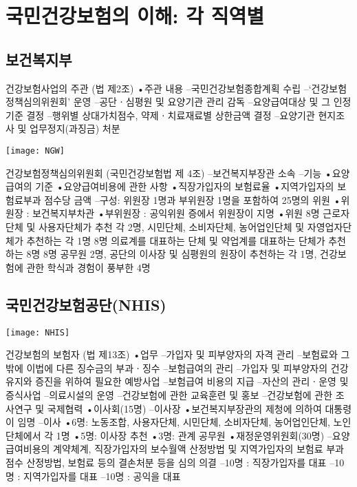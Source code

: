 \section{국민건강보험의 이해: 각 직역별}
\subsection{보건복지부}
건강보험사업의 주관 (법 제2조)
•주관 내용
–국민건강보험종합계획 수립
–‘건강보험정책심의위원회’ 운영
–공단ㆍ심평원 및 요양기관 관리 감독
–요양급여대상 및 그 인정기준 결정
–행위별 상대가치점수, 약제ㆍ치료재료별 상한금액 결정
–요양기관 현지조사 및 업무정지(과징금) 처분
\begin{center}
\texttt{[image: NGW]}
\end{center}
건강보험정책심의위원회 (국민건강보험법 제 4조)
–보건복지부장관 소속
–기능
•요양급여의 기준
•요양급여비용에 관한 사항
•직장가입자의 보험료율
•지역가입자의 보험료부과 점수당 금액
–구성: 위원장 1명과 부위원장 1명을 포함하여 25명의 위원
•위원장 : 보건복지부차관
•부위원장 : 공익위원 증에서 위원장이 지명
•위원
8명 근로자단체 및 사용자단체가 추천 각 2명,
시민단체, 소비자단체, 농어업인단체 및 자영업자단체가 추천하는 각 1명
8명 의료계를 대표하는 단체 및 약업계를 대표하는 단체가 추천하는 8명
8명 공무원 2명, 공단의 이사장 및 심평원의 원장이 추천하는 각 1명,
건강보험에 관한 학식과 경험이 풍부한 4명


\subsection{국민건강보험공단(NHIS)}
\begin{center}
\texttt{[image: NHIS]}
\end{center}
건강보험의 보험자 (법 제13조)
•업무
–가입자 및 피부양자의 자격 관리
–보험료와 그 밖에 이법에 다른 징수금의 부과ㆍ징수
–보험급여의 관리
–가입자 및 피부양자의 건강 유지와 증진을 위하여 필요한 예방사업
–보험급여 비용의 지급
–자산의 관리ㆍ운영 및 증식사업
–의료시설의 운영
–건강보험에 관한 교육훈련 및 홍보
–건강보험에 관한 조사연구 및 국제협력
•이사회(15명)
–이사장
•보건복지부장관의 제청에 의하여 대통령이 임명
–이사
•6명: 노동조합, 사용자단체, 시민단체, 소비자단체, 농어업인단체, 노인단체에서 각 1명
•5명: 이사장 추천
•3명: 관계 공무원
•재정운영위원회(30명)
–요양급여비용의 계약체계, 직장가입자의 보수월액 산정방법 및 지역가입자의 보험료 부과점수 산정방법, 보험료 등의 결손처분 등을 심의 의결
–10명 : 직장가입자를 대표
–10명 : 지역가입자를 대표
–10명 : 공익을 대표

